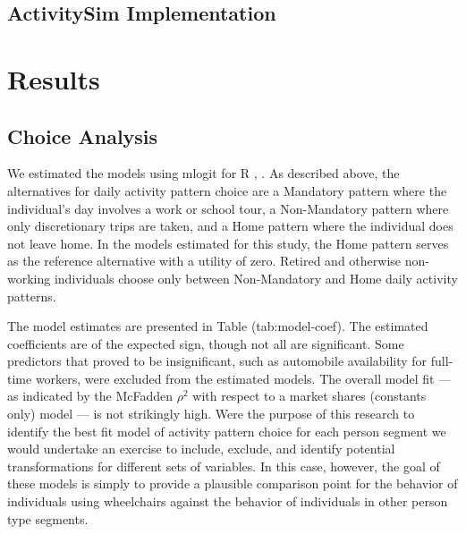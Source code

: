 \documentclass[3p, authoryear, review]{elsarticle} %
\begin{document}
\hypertarget{activitysim-implementation}{%
\subsection{ActivitySim Implementation}\label{activitysim-implementation}}

\hypertarget{results}{%
\section{Results}\label{results}}

\hypertarget{choice-analysis}{%
\subsection{Choice Analysis}\label{choice-analysis}}

We estimated the models using mlogit for R \citet{R}, \citet{mlogit}. As described above, the
alternatives for daily activity pattern choice are a Mandatory pattern where the
individual's day involves a work or school tour, a Non-Mandatory pattern where
only discretionary trips are taken, and a Home pattern where the individual does
not leave home. In the models estimated for this study, the Home pattern serves
as the reference alternative with a utility of zero. Retired and otherwise
non-working individuals choose only between Non-Mandatory and Home daily activity
patterns.

The model estimates are presented in
Table \citet{ref}(tab:model-coef).
The estimated coefficients are of the expected sign, though not all are significant.
Some predictors that proved to be insignificant, such as automobile availability
for full-time workers, were excluded from the estimated models.
The overall model fit --- as indicated by the McFadden \(\rho^2\) with respect to
a market shares (constants only) model --- is not strikingly high. Were the purpose
of this research to identify the best fit model of activity pattern choice for
each person segment we would undertake an exercise to include, exclude, and identify
potential transformations for different sets of variables. In this case, however,
the goal of these models is simply to provide a plausible comparison point for
the behavior of individuals using wheelchairs against the behavior of individuals
in other person type segments.
\end{document}
